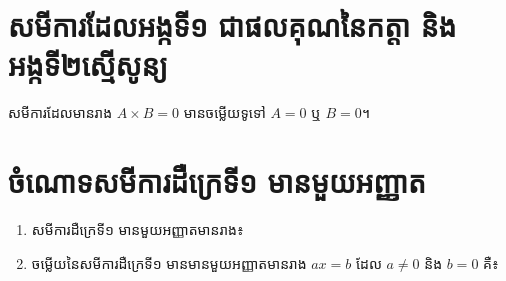 \section{សមីការដែលអង្កទី១ ជាផលគុណនៃកត្តា និងអង្កទី២ស្មើសូន្យ}
\begin{generality}
សមីការដែលមានរាង $A\times B=0$ មានចម្លើយទូទៅ $A=0$ ឬ $B=0$។
\end{generality}
\section{ចំណោទសមីការដឺក្រេទី១ មានមួយអញ្ញាត}

\newpage
\pros
\begin{enumerate}
\item សមីការដឺក្រេទី១ មានមួយអញ្ញាតមានរាង៖
\begin{enumerate}[label=\alph*.]
\end{enumerate}

\item  ចម្លើយនៃសមីការដឺក្រេទី១ មានមានមួយអញ្ញាតមានរាង $ax=b$ ដែល $a\ne 0$ និង $b=0$ គឺ៖
\begin{enumerate}[label=\alph*.]
\end{enumerate}


\end{enumerate}
